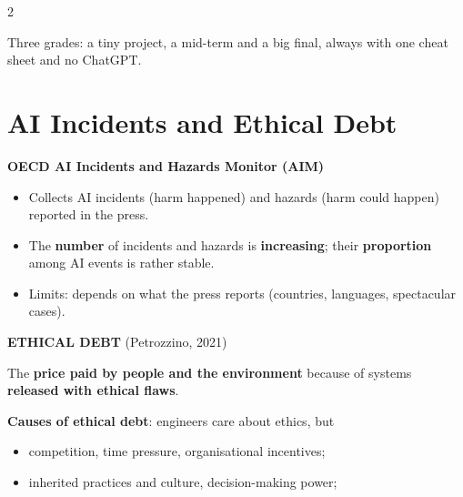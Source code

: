 \documentclass[a4paper,9pt]{extarticle}
\begin{document}
\begin{multicols}{2}
\begin{goat}

Three grades: a tiny project, a mid-term and a big final, always with one cheat sheet and no
ChatGPT.

\end{goat}



\section{AI Incidents and Ethical Debt}


\begin{example}

\textbf{OECD AI Incidents and Hazards Monitor (AIM)}

\begin{itemize}

\item Collects AI incidents (harm happened) and hazards (harm could happen) reported in the
press.

\item The \textbf{number} of incidents and hazards is \textbf{increasing}; their
\textbf{proportion} among AI events is rather stable.

\item Limits: depends on what the press reports (countries, languages, spectacular cases).

\end{itemize}

\end{example}


\begin{definition}

\textbf{ETHICAL DEBT} (Petrozzino, 2021)

The \textbf{price paid by people and the environment} because of systems
\textbf{released with ethical flaws}.

\end{definition}


\begin{important}

\textbf{Causes of ethical debt}: engineers care about ethics, but

\begin{itemize}

\item competition, time pressure, organisational incentives;

\item inherited practices and culture, decision-making power;


\end{itemize}
\end{important}
\end{multicols}
\end{document}
